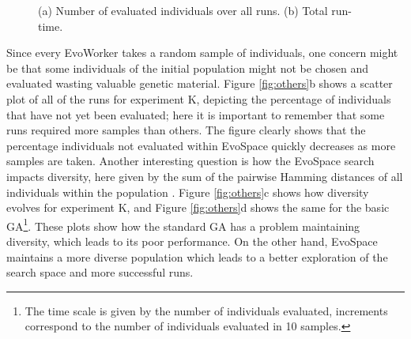 \begin{figure}[t]
    \centering
    \caption{
    (a) Number of evaluated individuals over all runs.
    (b) Total run-time.}
    \label{fig:effort}
\end{figure}

Since every EvoWorker takes a random sample of individuals, one concern might be that some individuals of the initial population might
not be chosen and evaluated wasting valuable genetic material.
Figure \ref{fig:others}b shows a scatter plot of all of the runs for experiment K, depicting the percentage of individuals
that have not yet been evaluated; here it is important to remember that some runs required more samples than others.
The figure clearly shows that the percentage individuals not evaluated within EvoSpace quickly decreases as more samples are taken.
Another interesting question is how the EvoSpace search impacts diversity, here given by the sum of the pairwise Hamming distances
of all individuals within the population \cite{diversity}.
Figure \ref{fig:others}c shows how diversity evolves for experiment K, and
Figure \ref{fig:others}d shows the same for the basic GA\footnote{The time scale is given by
the number of individuals evaluated, increments correspond to the number of individuals evaluated in 10 samples.}.
These plots show how the standard GA has a problem maintaining diversity, which leads to its poor performance.
On the other hand, EvoSpace maintains a more diverse population which leads to a better exploration of the search space and more successful runs.

